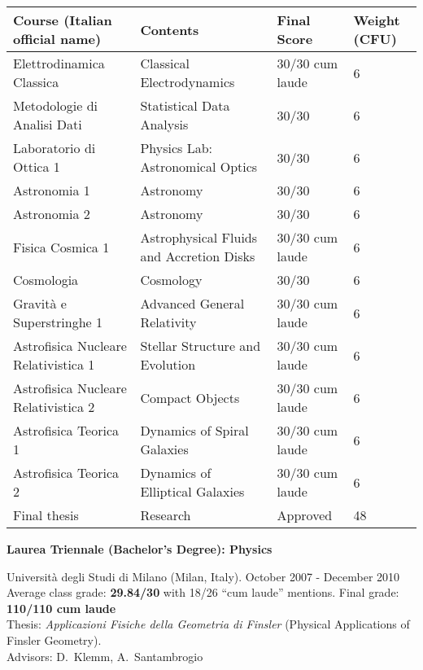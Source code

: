 \documentclass[11pt,letterpaper,sans]{moderncv}   %
\begin{document}
\vspace{-0.1cm}
{ \scriptsize
\begin{tabular*}{\linewidth}{l	@{\hspace{1.2cm}}l@{\hspace{1.2cm}}l@{\hspace{1.2cm}}l}
\textbf{Course (Italian official name)} &  \textbf{Contents}  &  \textbf{Final Score} & \textbf{Weight (CFU)}\\
\hline \hline
Elettrodinamica Classica  					&  Classical Electrodynamics	 & 30/30 cum laude &   6 \\	
Metodologie di Analisi Dati				&  Statistical Data Analysis	&  30/30 &   6 \\
Laboratorio di Ottica 1					&  Physics Lab: Astronomical Optics & 30/30 &   6\\	
Astronomia 1 							&  Astronomy &  30/30&   6\\	
Astronomia 2							&  Astronomy &30/30 &   6 \\	
Fisica Cosmica	1						&  Astrophysical Fluids and Accretion Disks & 30/30 cum laude &   6\\	
Cosmologia  							&  Cosmology & 30/30&   6 \\	
Gravità e Superstringhe 1 					&  Advanced General Relativity & 30/30 cum laude &   6\\	
Astrofisica Nucleare Relativistica 1			&  Stellar Structure and Evolution & 30/30 cum laude&   6\\	
Astrofisica Nucleare Relativistica 2			&  Compact Objects  & 30/30 cum laude&   6\\
Astrofisica Teorica 1						&  Dynamics of Spiral Galaxies & 30/30 cum laude&   6\\	
Astrofisica Teorica 2						&  Dynamics of Elliptical Galaxies & 30/30 cum laude &   6\\
Final thesis						& Research  & Approved &  48\\
\end{tabular*}
}
%
%
%

\vspace{0.3cm}
\textcolor{color1}{\large \textbf{Laurea Triennale (Bachelor's Degree): Physics}}
\vspace{0.1cm}

Università degli Studi di Milano (Milan, Italy). October 2007 - December 2010\\
Average class grade: \textbf{29.84/30} with 18/26  ``cum laude'' mentions.
Final grade: \textbf{110/110 cum laude} \\
{Thesis}: \textit{Applicazioni Fisiche della Geometria di Finsler} (Physical Applications of Finsler Geometry).\\
Advisors: D.~Klemm,  A.~Santambrogio\\
\end{document}
